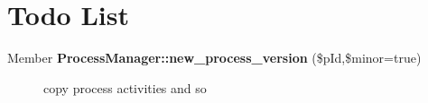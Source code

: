 \section{Todo List}\label{todo}
\label{_todo000001}
 \begin{description}
\item[Member {\bf Process\-Manager::new\_\-process\_\-version} (\$p\-Id,\$minor=true) ]copy process activities and so \end{description}
